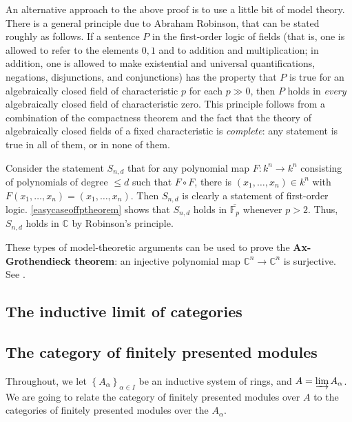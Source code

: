 \begin{remark} 
An alternative approach to the above proof is to use a little bit of model
theory. There is a general principle due to Abraham Robinson, that can be
stated roughly as follows. If a sentence  $P$ in the first-order logic of fields
(that is, one is allowed to refer to the elements $0,1$ and to addition and
multiplication; in addition, one is allowed to make existential and universal
quantifications, negations, disjunctions, and conjunctions) has the property
that $P$ is true for an algebraically closed field of characteristic $p$ for
each $p \gg 0$, then $P$ holds in \emph{every} algebraically closed field of
characteristic zero.
This principle follows from a combination of the compactness theorem and the
fact that the theory of algebraically closed fields of a fixed characteristic
is \emph{complete}: any statement is true in all of them, or in none of them.

Consider the statement $S_{n,d}$ that for any polynomial map $F: k^n \to k^n$
consisting of polynomials of degree $\leq d$ such that $F \circ F$, there is
$(x_1, \dots, x_n) \in k^n$ with $F(x_1, \dots, x_n) = (x_1, \dots, x_n)$.
Then $S_{n,d}$ is clearly a statement of first-order logic.
\cref{easycaseoffptheorem} shows that $S_{n,d}$ holds in
$\overline{\mathbb{F}_p}$ whenever $p > 2$. Thus, $S_{n,d}$ holds in
$\mathbb{C}$ by Robinson's principle.

These types of model-theoretic arguments can be used to prove the \textbf{Ax-Grothendieck
theorem}: an injective polynomial map $\mathbb{C}^n \to \mathbb{C}^n$ is
surjective. See \cite{Ma02}.
\end{remark} 

\subsection{The inductive limit of categories}




\subsection{The category of finitely presented modules}

Throughout, we let $\left\{A_{\alpha}\right\}_{\alpha \in I}$ be an inductive
system of rings, and $A = \varinjlim A_\alpha$.
We are going to relate the category of finitely presented modules over $A$ to
the categories of finitely presented modules over the $A_\alpha$.

